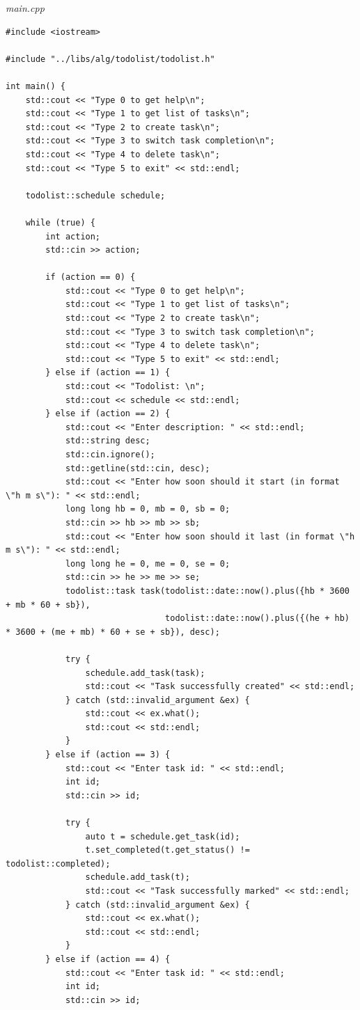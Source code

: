 \documentclass[a4paper,14pt]{extarticle}
\begin{document}
\textit{main.cpp}
\begin{verbatim}
#include <iostream>

#include "../libs/alg/todolist/todolist.h"

int main() {
    std::cout << "Type 0 to get help\n";
    std::cout << "Type 1 to get list of tasks\n";
    std::cout << "Type 2 to create task\n";
    std::cout << "Type 3 to switch task completion\n";
    std::cout << "Type 4 to delete task\n";
    std::cout << "Type 5 to exit" << std::endl;

    todolist::schedule schedule;

    while (true) {
        int action;
        std::cin >> action;

        if (action == 0) {
            std::cout << "Type 0 to get help\n";
            std::cout << "Type 1 to get list of tasks\n";
            std::cout << "Type 2 to create task\n";
            std::cout << "Type 3 to switch task completion\n";
            std::cout << "Type 4 to delete task\n";
            std::cout << "Type 5 to exit" << std::endl;
        } else if (action == 1) {
            std::cout << "Todolist: \n";
            std::cout << schedule << std::endl;
        } else if (action == 2) {
            std::cout << "Enter description: " << std::endl;
            std::string desc;
            std::cin.ignore();
            std::getline(std::cin, desc);
            std::cout << "Enter how soon should it start (in format \"h m s\"): " << std::endl;
            long long hb = 0, mb = 0, sb = 0;
            std::cin >> hb >> mb >> sb;
            std::cout << "Enter how soon should it last (in format \"h m s\"): " << std::endl;
            long long he = 0, me = 0, se = 0;
            std::cin >> he >> me >> se;
            todolist::task task(todolist::date::now().plus({hb * 3600 + mb * 60 + sb}),
                                todolist::date::now().plus({(he + hb) * 3600 + (me + mb) * 60 + se + sb}), desc);

            try {
                schedule.add_task(task);
                std::cout << "Task successfully created" << std::endl;
            } catch (std::invalid_argument &ex) {
                std::cout << ex.what();
                std::cout << std::endl;
            }
        } else if (action == 3) {
            std::cout << "Enter task id: " << std::endl;
            int id;
            std::cin >> id;

            try {
                auto t = schedule.get_task(id);
                t.set_completed(t.get_status() != todolist::completed);
                schedule.add_task(t);
                std::cout << "Task successfully marked" << std::endl;
            } catch (std::invalid_argument &ex) {
                std::cout << ex.what();
                std::cout << std::endl;
            }
        } else if (action == 4) {
            std::cout << "Enter task id: " << std::endl;
            int id;
            std::cin >> id;


\end{verbatim}
\end{document}
